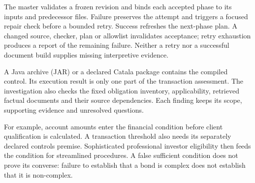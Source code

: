 \documentclass[12pt,a4paper,oneside,openany]{book}
\begin{document}
The master validates a frozen revision and binds each accepted phase to its
inputs and predecessor files.
Failure preserves the attempt and triggers a focused repair check before a
bounded retry. Success refreshes the next-phase plan. A changed source, checker,
plan or allowlist invalidates acceptance; retry exhaustion produces a report of
the remaining failure. Neither a retry nor a successful document build supplies
missing interpretive evidence.

\clearpage
{}
A Java archive (JAR) or a declared Catala package contains the compiled
control. Its execution result is only one part of the transaction assessment.
The investigation also checks the fixed obligation inventory, applicability,
retrieved factual documents and their source dependencies. Each finding keeps
its scope, supporting evidence and unresolved questions.

\begin{MapDiagram}
\end{MapDiagram}

For example, account amounts enter the financial condition before client
qualification is calculated. A transaction threshold also needs its separately
declared controls premise. Sophisticated professional investor eligibility then
feeds the condition for streamlined procedures. A false sufficient condition
does not prove its converse: failure to establish that a bond is complex does
not establish that it is non-complex.
\end{document}
